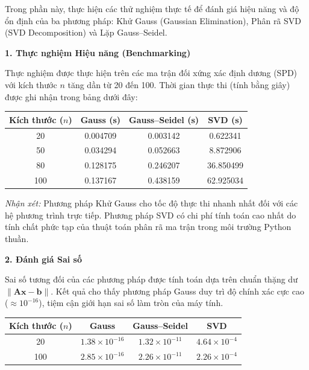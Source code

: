 \documentclass[12pt]{article}
\begin{document}
Trong phần này, thực hiện các thử nghiệm thực tế để đánh giá hiệu năng và độ ổn định của ba phương pháp: Khử Gauss (Gaussian Elimination), Phân rã SVD (SVD Decomposition) và Lặp Gauss--Seidel.

\textbf{1. Thực nghiệm Hiệu năng (Benchmarking)}

Thực nghiệm được thực hiện trên các ma trận đối xứng xác định dương (SPD) với kích thước $n$ tăng dần từ 20 đến 100. Thời gian thực thi (tính bằng giây) được ghi nhận trong bảng dưới đây:

\begin{center}
\begin{tabular}{|c|c|c|c|}
\hline
\textbf{Kích thước ($n$)} & \textbf{Gauss (s)} & \textbf{Gauss--Seidel (s)} & \textbf{SVD (s)} \\ \hline
20 & 0.004709 & 0.003142 & 0.622341 \\ \hline
50 & 0.034294 & 0.052663 & 8.872906 \\ \hline
80 & 0.128175 & 0.246207 & 36.850499 \\ \hline
100 & 0.137167 & 0.438159 & 62.925034 \\ \hline
\end{tabular}
\end{center}

\textit{Nhận xét:} Phương pháp Khử Gauss cho tốc độ thực thi nhanh nhất đối với các hệ phương trình trực tiếp. Phương pháp SVD có chi phí tính toán cao nhất do tính chất phức tạp của thuật toán phân rã ma trận trong môi trường Python thuần.

\textbf{2. Đánh giá Sai số}

Sai số tương đối của các phương pháp được tính toán dựa trên chuẩn thặng dư $\|\mathbf{Ax} - \mathbf{b}\|$. Kết quả cho thấy phương pháp Gauss duy trì độ chính xác cực cao ($ \approx 10^{-16}$), tiệm cận giới hạn sai số làm tròn của máy tính.

\begin{center}
\begin{tabular}{|c|c|c|c|}
\hline
\textbf{Kích thước ($n$)} & \textbf{Gauss} & \textbf{Gauss--Seidel} & \textbf{SVD} \\ \hline
20 & $1.38 \times 10^{-16}$ & $1.32 \times 10^{-11}$ & $4.64 \times 10^{-4}$ \\ \hline
100 & $2.85 \times 10^{-16}$ & $2.26 \times 10^{-11}$ & $2.26 \times 10^{-4}$ \\ \hline
\end{tabular}
\end{center}
\end{document}
